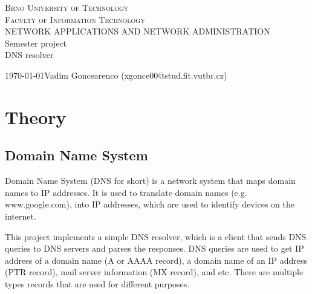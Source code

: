 \documentclass[a4paper, 11pt]{article}
\begin{document}
\begin{center}
    \Huge
    \textsc{Brno University of Technology\\\huge Faculty of Information Technology}\\
    \LARGE
    NETWORK APPLICATIONS AND NETWORK ADMINISTRATION\\\LARGE 
    Semester project\\\Huge
    \Huge DNS resolver\\
\end{center}
{\Large \today \hfill Vadim Goncearenco (xgonce00@stud.fit.vutbr.cz)}
\newpage

\tableofcontents
\newpage



\newcommand{\todo}[1]{\textcolor{orange}{\textbf{[[#1]]}}}
\newcommand{\desc}[1]{\textcolor{gray}{\textbf{[[#1]]}}}


\section{Theory}
    \subsection{Domain Name System}
        Domain Name System (DNS for short) is a network system that maps domain names to IP addresses.
        It is used to translate domain names (e.g. www.google.com), into IP addresses, 
        which are used to identify devices on the internet.

        This project implements a simple DNS resolver, which is a client that sends DNS queries to DNS servers and parses the responses.
        DNS queries are used to get IP address of a domain name (A or AAAA record), a domain name of an IP address (PTR record), mail server information (MX record), and etc.
        There are multiple types records that are used for different purposes.
\end{document}
